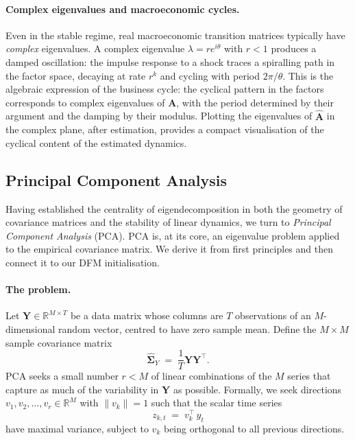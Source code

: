 \documentclass[11pt, a4paper, oneside]{article}
\newcommand{\mY}{\mathbf{Y}}
\begin{document}
\paragraph{Complex eigenvalues and macroeconomic cycles.}
Even in the stable regime, real macroeconomic transition matrices
typically have \emph{complex} eigenvalues. A complex eigenvalue
$\lambda = r e^{i\theta}$ with $r < 1$ produces a damped oscillation:
the impulse response to a shock traces a spiralling path in the
factor space, decaying at rate $r^k$ and cycling with period
$2\pi/\theta$. This is the algebraic expression of the business
cycle: the cyclical pattern in the factors corresponds to complex
eigenvalues of $\mathbf{A}$, with the period determined by their
argument and the damping by their modulus. Plotting the eigenvalues
of $\widehat{\mathbf{A}}$ in the complex plane, after estimation,
provides a compact visualisation of the cyclical content of the
estimated dynamics.

\subsection{Principal Component Analysis}
\label{subsec:pca-theory}

Having established the centrality of eigendecomposition in both the
geometry of covariance matrices and the stability of linear dynamics,
we turn to \emph{Principal Component Analysis} (PCA). PCA is, at its
core, an eigenvalue problem applied to the empirical covariance
matrix. We derive it from first principles and then connect it to
our DFM initialisation.

\paragraph{The problem.}
Let $\mY \in \mathbb{R}^{M \times T}$ be a data matrix whose columns
are $T$ observations of an $M$-dimensional random vector, centred to
have zero sample mean. Define the $M \times M$ sample covariance
matrix
\[
\widehat{\boldsymbol{\Sigma}}_Y \;=\; \frac{1}{T} \mY \mY^{\top}.
\]
PCA seeks a small number $r < M$ of linear combinations of the $M$
series that capture as much of the variability in $\mY$ as possible.
Formally, we seek directions $v_1, v_2, \ldots, v_r \in \mathbb{R}^M$
with $\|v_k\| = 1$ such that the scalar time series
\[
z_{k, t} \;=\; v_k^{\top}\, y_t
\]
have maximal variance, subject to $v_k$ being orthogonal to all
previous directions.
\end{document}

